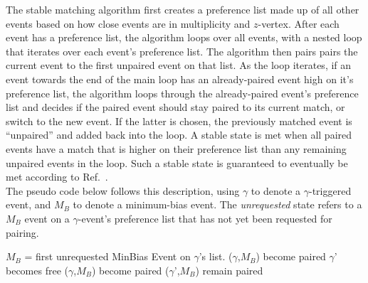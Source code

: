 The stable matching algorithm first creates a preference list made up of all other events based on how close events are in multiplicity and $z$-vertex. After each event has a preference list, the algorithm loops over all events, with a nested loop that iterates over each event's preference list. The algorithm then pairs  pairs the current event to the first unpaired event on that list. As the loop iterates, if an event towards the end of the main loop has an already-paired event high on it’s preference list, the algorithm loops through the already-paired event's preference list and decides if the paired event should stay paired to its current match, or switch to the new event. If the latter is chosen, the previously matched event is “unpaired” and added back into the loop. A stable state is met when all paired events have a match that is higher on their preference list than any remaining unpaired events in the loop. Such a stable state is guaranteed to eventually be met according to Ref.~\cite{GaleShapley:1962amm}.\\

The pseudo code below follows this description, using \(\gamma\) to denote a \(\gamma\)-triggered event, and \(M_B\) to denote a minimum-bias event. The \textit{unrequested} state refers to a \(M_B\) event on a \(\gamma\)-event's preference list that has not yet been requested for pairing.\\

\FloatBarrier
\begin{algorithmic}
\State \(M_B\) = first unrequested MinBias Event on \(\gamma\)'s list.
\State (\(\gamma\),\(M_B\)) become paired
%
    \State \(\gamma\)' becomes free
    \State (\(\gamma\),\(M_B\)) become paired
    \Else
    \State (\(\gamma\)',\(M_B\)) remain paired
    \EndIf
\EndIf
\EndWhile
\EndProcedure
\end{algorithmic}


